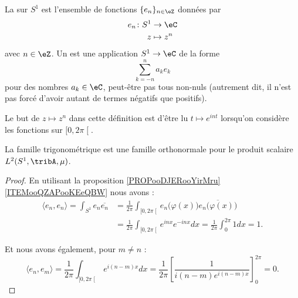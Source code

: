 \begin{definition}
    La  sur \( S^1\) est l'ensemble de fonctions \( \{ e_n \}_{n\in \eZ}\) données par
    \begin{equation}
        \begin{aligned}
            e_n\colon S^1&\to \eC \\
            z&\mapsto z^n
        \end{aligned}
    \end{equation}
    avec \( n\in \eZ\). Un  est une application \( S^1\to \eC\) de la forme
    \begin{equation}
        \sum_{k=-n}^na_ke_k
    \end{equation}
    pour des nombres \( a_k\in \eC\), peut-être pas tous non-nuls (autrement dit, il n'est pas forcé d'avoir autant de termes négatifs que positifs).
\end{definition}
Le but de \( z\mapsto z^n\) dans cette définition est d'être lu \(  t\mapsto e^{in t}\) lorsqu'on considère les fonctions sur \( \mathopen[ 0 , 2\pi \mathclose[\).

\begin{proposition}     \label{PROPooOMGFooROFFFr}
    La famille trigonométrique est une famille orthonormale pour le produit scalaire \( L^2(S^1,\tribA,\mu)\).
\end{proposition}

\begin{proof}
    En utilisant la proposition \ref{PROPooDJERooYirMru}\ref{ITEMooQZAPooKEeQBW} nous avons :
    \begin{subequations}
        \begin{align}
            \langle e_n, e_n\rangle =\int_{S^1}e_n\overline{ e_n }&=\frac{1}{ 2\pi }\int_{\mathopen[ 0 , 2\pi \mathclose[}e_n\big( \varphi(x) \big)\overline{ e_n\big( \varphi(x) \big) }\\
                &=\frac{1}{ 2\pi }\int_{\mathopen[ 0 , 2\pi \mathclose[} e^{inx} e^{-inx}dx=\frac{1}{ 2\pi }\int_{0}^{2\pi}1dx=1.
        \end{align}
    \end{subequations}

    Et nous avons également, pour \( m\neq n\) :
    \begin{equation}
        \langle e_n, e_m\rangle =\frac{1}{ 2\pi }\int_{\mathopen[ 0 , 2\pi \mathclose[} e^{i(n-m)x}dx=\frac{1}{ 2\pi }\left[ \frac{1}{ i(n-m) e^{i(n-m)x} } \right]_0^{2\pi}=0.
    \end{equation}
\end{proof}


